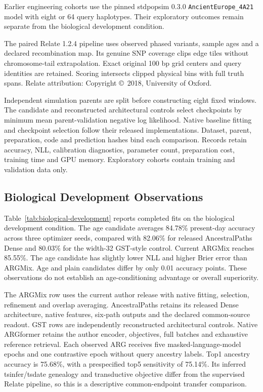 \documentclass[letterpaper]{article}
\begin{document}
Earlier engineering cohorts use the pinned stdpopsim 0.3.0 \texttt{AncientEurope\_4A21} model with eight or 64 query haplotypes. Their exploratory outcomes remain separate from the biological development condition.

The paired Relate 1.2.4 pipeline uses observed phased variants, sample ages and a declared recombination map. Its genuine SNP coverage clips edge tiles without chromosome-tail extrapolation. Exact original 100 bp grid centers and query identities are retained. Scoring intersects clipped physical bins with full truth spans. Relate attribution: Copyright \copyright\ 2018, University of Oxford.

Independent simulation parents are split before constructing eight fixed windows. The candidate and reconstructed architectural controls select checkpoints by minimum mean parent-validation negative log likelihood. Native baseline fitting and checkpoint selection follow their released implementations. Dataset, parent, preparation, code and prediction hashes bind each comparison. Records retain accuracy, NLL, calibration diagnostics, parameter count, preparation cost, training time and GPU memory. Exploratory cohorts contain training and validation data only.


\subsection{Biological Development Observations}

Table~\ref{tab:biological-development} reports completed fits on the biological development condition. The age candidate averages 84.78\% present-day accuracy across three optimizer seeds, compared with 82.06\% for released AncestralPaths Dense and 80.03\% for the width-32 GST-style control. Current ARGMix reaches 85.55\%. The age candidate has slightly lower NLL and higher Brier error than ARGMix. Age and plain candidates differ by only 0.01 accuracy points. These observations do not establish an age-conditioning advantage or overall superiority.

The ARGMix row uses the current author release with native fitting, selection, refinement and overlap averaging. AncestralPaths retains its released Dense architecture, native features, six-path outputs and the declared common-source readout. GST rows are independently reconstructed architectural controls. Native ARGformer retains the author encoder, objectives, full batches and exhaustive reference retrieval. Each observed ARG receives five masked-language-model epochs and one contrastive epoch without query ancestry labels. Top1 ancestry accuracy is 75.68\%, with a prespecified top5 sensitivity of 75.14\%. Its inferred tsinfer/tsdate genealogy and transductive objective differ from the supervised Relate pipeline, so this is a descriptive common-endpoint transfer comparison.
\end{document}
